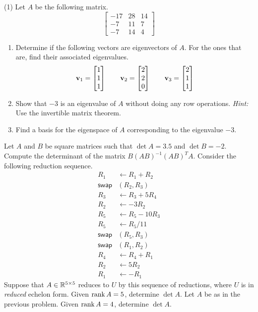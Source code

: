 \begin{tasks}[resume, style=enumerate](1)
\task
  Let $A$ be the following matrix.
  \begin{displaymath}
    \begin{bmatrix}
      -17 & 28 & 14 \\
      -7 & 11 & 7 \\
      -7 & 14 & 4
    \end{bmatrix}
  \end{displaymath}
  \begin{enumerate}[label=(\alph*)]
  \item
    Determine if the following vectors are eigenvectors of $A$. For
    the ones that are, find their associated eigenvalues.
    \begin{displaymath}
      \mathbf v_1 =  \begin{bmatrix} 1 \\ 1 \\ 1 \end{bmatrix} 
      \qquad
      \mathbf v_2 =  \begin{bmatrix} 2 \\ 2 \\ 0 \end{bmatrix} 
      \qquad
      \mathbf v_3 =  \begin{bmatrix} 2 \\ 1 \\ 1 \end{bmatrix} 
    \end{displaymath}
  \item
    Show that $-3$ is an eigenvalue of $A$ without doing any row
    operations.  \textit{Hint:} Use the invertible matrix theorem.
  \item
    Find a basis for the eigenspace of $A$ corresponding to the
    eigenvalue $-3$.
\end{enumerate}
\task Let $A$ and $B$ be square matrices such that $\det A = 3.5$ and
  $\det B = -2$.  Compute the determinant of the matrix
  $B(AB)^{-1}(AB)^TA$.
\task Consider the following reduction sequence.
  \begin{align*}
    R_1 &\gets R_1 + R_2 \\
    \mathsf{swap}&(R_2, R_3) \\
    R_3 &\gets R_3 + 5R_4 \\
    R_2 &\gets -3R_2 \\
    R_5 &\gets R_5 - 10R_3 \\
    R_5 &\gets R_5 / 11 \\
    \mathsf{swap}&(R_5, R_3) \\
    \mathsf{swap}&(R_1, R_2) \\
    R_4 &\gets R_4 + R_1 \\
    R_2 &\gets 5R_2 \\
    R_1 &\gets -R_1
  \end{align*}
  Suppose that $A \in \mathbb R^{5 \times 5}$ reduces to $U$ by this sequence
  of reductions, where $U$ is in \textit{reduced} echelon form.  Given
  $\operatorname{\mathrm{rank}} A = 5$, determine $\det A$.
\task
  Let $A$ be as in the previous problem. Given $\operatorname{\mathrm{rank}} A = 4$, determine $\det A$.

\end{tasks}
